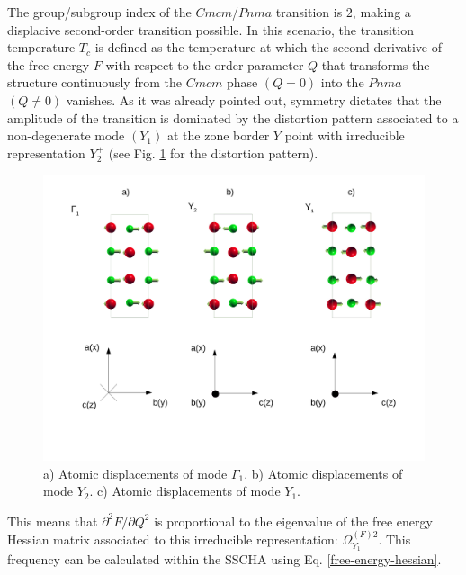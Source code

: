 The group/subgroup index of the $Cmcm$/$Pnma$ transition is $2$, making a displacive second-order transition possible\cite{toledano1987landau}. In this scenario, the transition temperature $T_{c}$ is defined as the temperature 
at which the second derivative of the free energy $F$ with respect to the order parameter $Q$ that transforms the structure continuously from the $Cmcm$ phase $(Q=0)$ into the $Pnma$ $(Q\ne0)$ vanishes. As it was already 
pointed out\cite{chattopadhyay1986neutron}, symmetry\cite{orobengoa2009amplimodes,perez2010mode} dictates that the amplitude of the transition is dominated by the distortion pattern associated to a non-degenerate mode $(Y_{1})$
at the zone border $Y$ point with irreducible representation $Y_{2}^{+}$ (see Fig. \ref{patterns} for the distortion pattern).
\begin{figure}[h]
\begin{center}
\includegraphics[width=0.8\linewidth]{Figures/normal-modes.pdf}
\caption[Phonon eigenvector patterns.]{a) Atomic displacements of mode $\Gamma_{1}$. b) Atomic displacements of mode $Y_{2}$. c) Atomic displacements of mode $Y_{1}$.}
\label{patterns}
\end{center}
\end{figure}
This means that $\partial^{2}F/\partial Q^{2}$ is proportional to the eigenvalue of the free energy Hessian matrix associated to this irreducible representation: $\Omega^{(F)2}_{Y_{1}}$. This frequency can be calculated within the 
SSCHA using Eq. \ref{free-energy-hessian}. \\

